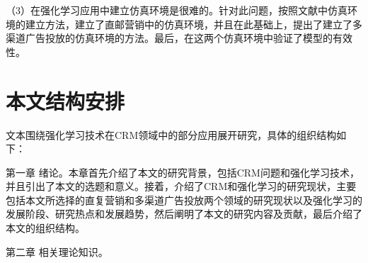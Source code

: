 （3）在强化学习应用中建立仿真环境是很难的。针对此问题，按照文献\citep{pednault2002sequential}中仿真环境的建立方法，建立了直邮营销中的仿真环境，并且在此基础上，提出了建立了多渠道广告投放的仿真环境的方法。最后，在这两个仿真环境中验证了模型的有效性。

\section{本文结构安排}
文本围绕强化学习技术在CRM领域中的部分应用展开研究，具体的组织结构如下：

第一章 绪论。本章首先介绍了本文的研究背景，包括CRM问题和强化学习技术，并且引出了本文的选题和意义。接着，介绍了CRM和强化学习的研究现状，主要包括本文所选择的直复营销和多渠道广告投放两个领域的研究现状以及强化学习的发展阶段、研究热点和发展趋势，然后阐明了本文的研究内容及贡献，最后介绍了本文的组织结构。

第二章 相关理论知识。
